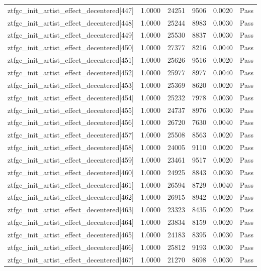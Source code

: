 \begin{table}[htbp]
\begin{tabular}{llrrll}
ztfgc\_init\_artist\_effect\_decentered[447] & 1.0000 & 24251 & 9506 & 0.0020 & Pass \\
ztfgc\_init\_artist\_effect\_decentered[448] & 1.0000 & 25244 & 8983 & 0.0030 & Pass \\
ztfgc\_init\_artist\_effect\_decentered[449] & 1.0000 & 25530 & 8837 & 0.0030 & Pass \\
ztfgc\_init\_artist\_effect\_decentered[450] & 1.0000 & 27377 & 8216 & 0.0040 & Pass \\
ztfgc\_init\_artist\_effect\_decentered[451] & 1.0000 & 25626 & 9516 & 0.0020 & Pass \\
ztfgc\_init\_artist\_effect\_decentered[452] & 1.0000 & 25977 & 8977 & 0.0040 & Pass \\
ztfgc\_init\_artist\_effect\_decentered[453] & 1.0000 & 25369 & 8620 & 0.0020 & Pass \\
ztfgc\_init\_artist\_effect\_decentered[454] & 1.0000 & 25232 & 7978 & 0.0030 & Pass \\
ztfgc\_init\_artist\_effect\_decentered[455] & 1.0000 & 24737 & 8976 & 0.0030 & Pass \\
ztfgc\_init\_artist\_effect\_decentered[456] & 1.0000 & 26720 & 7630 & 0.0040 & Pass \\
ztfgc\_init\_artist\_effect\_decentered[457] & 1.0000 & 25508 & 8563 & 0.0020 & Pass \\
ztfgc\_init\_artist\_effect\_decentered[458] & 1.0000 & 24005 & 9110 & 0.0020 & Pass \\
ztfgc\_init\_artist\_effect\_decentered[459] & 1.0000 & 23461 & 9517 & 0.0020 & Pass \\
ztfgc\_init\_artist\_effect\_decentered[460] & 1.0000 & 24925 & 8843 & 0.0030 & Pass \\
ztfgc\_init\_artist\_effect\_decentered[461] & 1.0000 & 26594 & 8729 & 0.0040 & Pass \\
ztfgc\_init\_artist\_effect\_decentered[462] & 1.0000 & 26915 & 8942 & 0.0020 & Pass \\
ztfgc\_init\_artist\_effect\_decentered[463] & 1.0000 & 23323 & 8435 & 0.0020 & Pass \\
ztfgc\_init\_artist\_effect\_decentered[464] & 1.0000 & 23834 & 8159 & 0.0020 & Pass \\
ztfgc\_init\_artist\_effect\_decentered[465] & 1.0000 & 24183 & 8395 & 0.0030 & Pass \\
ztfgc\_init\_artist\_effect\_decentered[466] & 1.0000 & 25812 & 9193 & 0.0030 & Pass \\
ztfgc\_init\_artist\_effect\_decentered[467] & 1.0000 & 21270 & 8698 & 0.0030 & Pass \\

\end{tabular}
\end{table}

